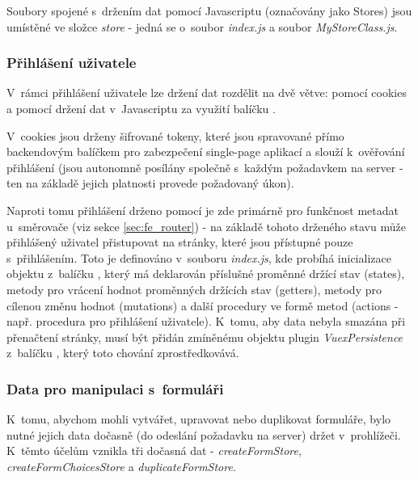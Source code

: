 	Soubory spojené s~držením dat pomocí Javascriptu (označovány jako Stores) jsou umístěné ve složce \textit{store} - jedná se o~soubor \textit{index.js} a soubor \textit{MyStoreClass.js}.
	
		\subsubsection{Přihlášení uživatele}
		V~rámci přihlášení uživatele lze držení dat rozdělit na dvě větve: pomocí cookies a pomocí držení dat v~Javascriptu za využití balíčku . 
		
		V~cookies jsou drženy šifrované tokeny, které jsou spravované přímo backendovým balíčkem pro zabezpečení single-page aplikací  a slouží k~ověřování přihlášení (jsou autonomně posílány společně s~každým požadavkem na server - ten na základě jejich platnosti provede požadovaný úkon). 
		
		Naproti tomu přihlášení drženo pomocí  je zde primárně pro funkčnost metadat u~směrovače (viz sekce \ref{sec:fe_router}) - na základě tohoto drženého stavu může přihlášený uživatel přistupovat na stránky, které jsou přístupné pouze s~přihlášením. Toto je definováno v~souboru \textit{index.js}, kde probíhá inicializace objektu z~balíčku , který má deklarován příslušné proměnné držící stav (states), metody pro vrácení hodnot proměnných držících stav (getters), metody pro cílenou změnu hodnot (mutations) a další procedury ve formě metod (actions - např. procedura pro přihlášení uživatele). K~tomu, aby data nebyla smazána při přenačtení stránky, musí být přidán zmíněnému objektu plugin \textit{VuexPersistence} z~balíčku , který toto chování zprostředkovává.
		
		\subsubsection{Data pro manipulaci s~formuláři}\label{sec:data_prohlizec_form}
		K~tomu, abychom mohli vytvářet, upravovat nebo duplikovat formuláře, bylo nutné jejich data dočasně (do odeslání požadavku na server) držet v~prohlížeči. K~těmto účelům vznikla tři dočasná  dat - \textit{createFormStore}, \textit{createFormChoicesStore} a \textit{duplicateFormStore}.
		
